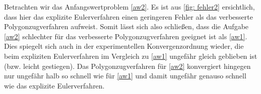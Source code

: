 \documentclass[ %
ngerman, %
a4paper, %
12pt, %
sectionreset, %
chapterstyle=framed, %
sectionstyle=dotted, %
titlefont=osfamily %
]{../../../../texmf/tex/latex/mathscriptMathTUD/mathscriptMathTUD}
\begin{document}
	Betrachten wir das Anfangswertproblem \eqref{aw2}. Es ist aus \cref{fig: fehler2} ersichtlich, dass hier das explizite Eulerverfahren einen geringeren Fehler als das verbesserte Polygonzugverfahren aufweist. Somit lässt sich also schließen, dass die Aufgabe \eqref{aw2} schlechter für das verbesserte Polygonzugverfahren geeignet ist als \eqref{aw1}. Dies spiegelt sich auch in der experimentellen Konvergenzordnung wieder, die beim expliziten Eulerverfahren im Vergleich zu \eqref{aw1} ungefähr gleich geblieben ist (bzw. leicht gestiegen). Das Polygonzugverfahren für \eqref{aw2} konvergiert hingegen nur ungefähr halb so schnell wie für \eqref{aw1} und damit ungefähr genauso schnell wie das explizite Eulerverfahren.
	
\end{document}
